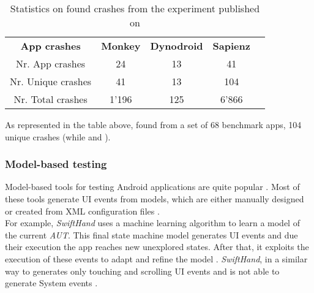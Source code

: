 \begin{table}[tb]
\centering
\caption{Statistics on found crashes from the \sapienz experiment published on \cite{sapienz}}
\label{sapienz experiment results}
\begin{tabular}{|c|c|c|c|l}
\cline{1-4}
\textbf{App crashes} & \textbf{Monkey} & \textbf{Dynodroid} & \textbf{Sapienz} &  \\ \cline{1-4}
Nr. App crashes      & 24              & 13                 & 41               &  \\ \cline{1-4}
Nr. Unique crashes   & 41              & 13                 & 104              &  \\ \cline{1-4}
Nr. Total crashes    & 1'196           & 125                & 6'866             &  \\ \cline{1-4}
\end{tabular}
\end{table}
As represented in the table above, \sapienz found from a set of 68 benchmark apps, 104 unique crashes (while  and ).

\subsubsection{Model-based testing}
Model-based tools for testing Android applications are quite popular \cite{sapienz}. Most of these tools \cite{mobiguitar, mining, guiripper,swift} generate UI events from models, which are either manually designed or created from XML configuration files \cite{sapienz}. \\
For example, \textit{SwiftHand} \cite{swift} uses a machine learning algorithm to learn a model of the current \textit{AUT}. This final state machine model \cite{areWeThereYet} generates UI events and due their execution the app reaches new unexplored states. After that, it exploits the execution of these events to adapt and refine the model \cite{swift}. \textit{SwiftHand}, in a similar way to \monkey generates only touching and scrolling UI events and is not able to generate System events \cite{areWeThereYet}.

